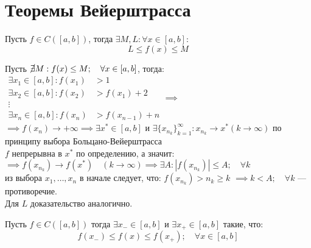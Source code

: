 \section{Теоремы Вейерштрасса}
\begin{theorem}
	\label{theorem:weierstrass1}
	Пусть $f \in C([a,b])$, тогда $\exists M,L: \forall x \in [a,b]:$ 
	\[L \le f(x) \le M\] 
\end{theorem}
\begin{replacementproof}
	Пусть $\cancel{\exists} M: f(x)\le M; \quad \forall x \in [a,b]$, тогда:\\
	$\begin{aligned}
		\exists x_1 \in [a,b]: f(x_1) & >1 \\ 
        \exists x_2 \in [a,b]: f(x_2) &>f(x_1)+2 \\ 
        \vdots\\ 
        \exists x_n \in [a,b]: f(x_n) &>f(x_{n-1})+n 
	\end{aligned}\implies $\\
	$\implies f(x_n) \to +\infty \implies \exists x^* \in [a,b]$ и $\exists \{x_{n_k}\}^{\infty}_{k=1}: x_{n_k}\to x^* (k\to \infty)$ по принципу выбора Больцано-Вейерштрасса\\
	$f$ непрерывна в $x^*$ по определению, а значит:\\
	$\implies f(x_{n_k}) \to f(x^*) \quad (k\to \infty) \implies \exists A: |f(x_{n_k})|\le A; \quad \forall k$\\
	из выбора $x_1, \ldots, x_n$ в начале следует, что: $f(x_{n_k})>n_k\ge k $
	$\implies k < A; \quad  \forall k$ --- противоречие.\\

	Для $L$ доказательство аналогично.
\end{replacementproof}


\begin{theorem}
	Пусть $f \in C([a,b])$ тогда $\exists x_- \in [a,b]$ и $\exists x_{+} \in [a,b]$ такие, что:\\
	$$f(x_{-})\le f(x) \le f(x_{+}); \quad \forall x \in [a,b]$$\\
\end{theorem}

